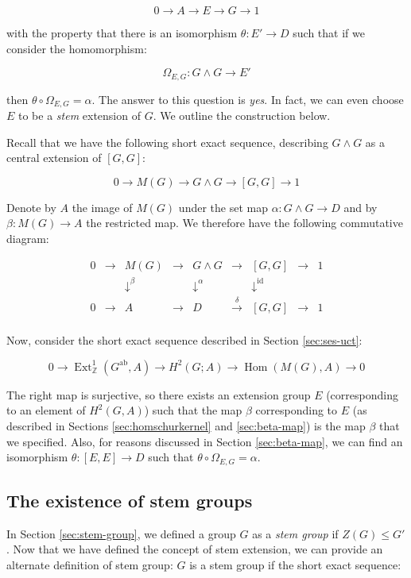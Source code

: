 $$0 \to A \to E \to G \to 1$$

with the property that there is an isomorphism $\theta:E' \to D$ such
that if we consider the homomorphism:

$$\Omega_{E,G}: G \wedge G \to E'$$

then $\theta \circ \Omega_{E,G} = \alpha$. The answer to this question is
{\em yes}. In fact, we can even choose $E$ to be a {\em stem}
extension of $G$. We outline the construction below.

Recall that we have the following short exact sequence, describing $G
\wedge G$ as a central extension of $[G,G]$:

$$0 \to M(G) \to G \wedge G \to [G,G] \to 1$$

Denote by $A$ the image of $M(G)$ under the set map $\alpha:G \wedge G
\to D$ and by $\beta:M(G) \to A$ the restricted map. We therefore
have the following commutative diagram:

$$\begin{array}{ccccccccc}
  0 & \to & M(G) & \to & G \wedge G & \to & [G,G] & \to & 1\\
  &&   \downarrow^{\beta}  &&  \downarrow^{\alpha}     && \downarrow^{\text{id}} && \\
  0 & \to & A &\to & D & \stackrel{\delta}{\to} & [G,G] & \to & 1\\
\end{array}$$

Now, consider the short exact sequence described in Section
\ref{sec:ses-uct}:

$$0 \to \operatorname{Ext}^1_{\mathbb{Z}}(G^{\operatorname{ab}},A) \to H^2(G;A) \to \operatorname{Hom}(M(G),A) \to 0$$

The right map is surjective, so there exists an extension group $E$
(corresponding to an element of $H^2(G,A)$) such that the map $\beta$
corresponding to $E$ (as described in Sections
\ref{sec:homschurkernel} and \ref{sec:beta-map}) is the map $\beta$
that we specified. Also, for reasons discussed in Section
\ref{sec:beta-map}, we can find an isomorphism $\theta:[E,E] \to D$
such that $\theta \circ \Omega_{E,G} = \alpha$.

\subsection{The existence of stem groups}\label{sec:stem-group-existence}

In Section \ref{sec:stem-group}, we defined a group $G$ as a {\em stem
  group} if $Z(G) \le G'$. Now that we have defined the concept of
stem extension, we can provide an alternate definition of stem group:
$G$ is a stem group if the short exact sequence:

